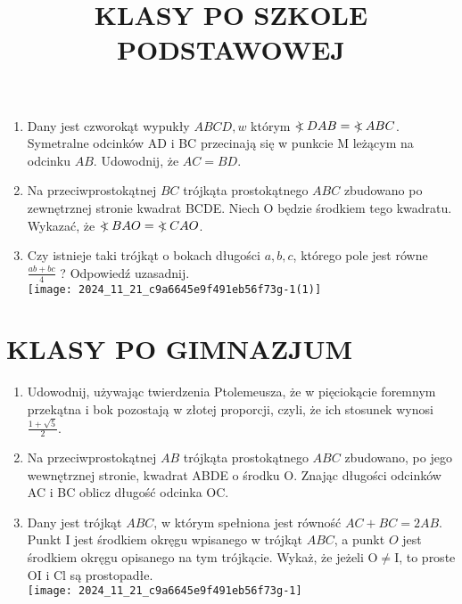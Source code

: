 \documentclass[10pt]{article}
\title{KLASY PO SZKOLE PODSTAWOWEJ }
\author{}
\date{}
\newcommand\Varangle{\mathop{{<\!\!\!\!\!\text{\small)}}\:}\nolimits}
\begin{document}
\maketitle
\begin{enumerate}
  \item Dany jest czworokąt wypukły \(A B C D, w\) którym \(\Varangle D A B=\Varangle A B C\). Symetralne odcinków AD i BC przecinają się w punkcie M leżącym na odcinku \(A B\). Udowodnij, że \(A C=B D\).
  \item Na przeciwprostokątnej \(B C\) trójkąta prostokątnego \(A B C\) zbudowano po zewnętrznej stronie kwadrat BCDE. Niech O będzie środkiem tego kwadratu. Wykazać, że \(\Varangle B A O=\Varangle C A O\).
  \item Czy istnieje taki trójkąt o bokach długości \(a, b, c\), którego pole jest równe \(\frac{a b+b c}{4}\) ? Odpowiedź uzasadnij.\\
\texttt{[image: 2024\_11\_21\_c9a6645e9f491eb56f73g-1(1)]}
\end{enumerate}

\section*{KLASY PO GIMNAZJUM}
\begin{enumerate}
  \item Udowodnij, używając twierdzenia Ptolemeusza, że w pięciokącie foremnym przekątna i bok pozostają w złotej proporcji, czyli, że ich stosunek wynosi \(\frac{1+\sqrt{5}}{2}\).
  \item Na przeciwprostokątnej \(A B\) trójkąta prostokątnego \(A B C\) zbudowano, po jego wewnętrznej stronie, kwadrat ABDE o środku O. Znając długości odcinków AC i BC oblicz długość odcinka OC.
  \item Dany jest trójkąt \(A B C\), w którym spełniona jest równość \(A C+B C=2 A B\). Punkt I jest środkiem okręgu wpisanego w trójkąt \(A B C\), a punkt \(O\) jest środkiem okręgu opisanego na tym trójkącie. Wykaż, że jeżeli \(\mathrm{O} \neq \mathrm{I}\), to proste OI i Cl są prostopadłe.\\
\texttt{[image: 2024\_11\_21\_c9a6645e9f491eb56f73g-1]}
\end{enumerate}
\end{document}
